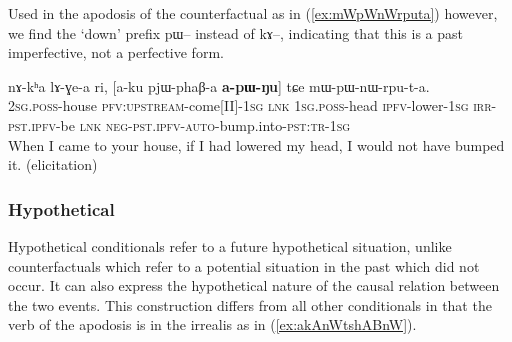 \documentclass[oldfontcommands,oneside,a4paper,11pt]{article}
\newcommand{\ipa}[1]{{\phon \mbox{#1}}} %
\newcommand{\refb}[1]{(\ref{#1})}
\begin{document}
Used in the apodosis of the counterfactual as in \refb{ex:mWpWnWrputa} however, we find the `down' prefix \ipa{pɯ}-- instead of \ipa{kɤ}--, indicating that this is a past imperfective, not a perfective form.

     \begin{exe}
   \ex \label{ex:mWpWnWrputa}
   \gll
\ipa{nɤ-kʰa}   	\ipa{lɤ-ɣe-a}   	\ipa{ri,}   	[\ipa{a-ku}   	\ipa{pjɯ-phaβ-a}   	\textbf{\ipa{a-pɯ-ŋu}}]   	\ipa{tɕe}   	\ipa{mɯ-pɯ-nɯ-rpu-t-a.}     \\
\textsc{2sg.poss}-house \textsc{pfv:upstream}-come[II]-\textsc{1sg} \textsc{lnk} \textsc{1sg.poss}-head \textsc{ipfv}-lower-\textsc{1sg} \textsc{irr-pst.ipfv}-be \textsc{lnk}
 \textsc{neg-pst.ipfv-auto}-bump.into-\textsc{pst:tr-1sg} \\
\glt  When I came to your house, if I had lowered my head, I would not have bumped it. (elicitation)
\end{exe}



%




\subsubsection{Hypothetical}
Hypothetical conditionals refer to a future hypothetical situation,   unlike counterfactuals which refer to a potential situation in the past which did not occur. It can also express the hypothetical nature of the causal relation between the two events. This construction differs from all other conditionals in that the verb of the apodosis is in the irrealis as in \refb{ex:akAnWtshABnW}.
\end{document}
